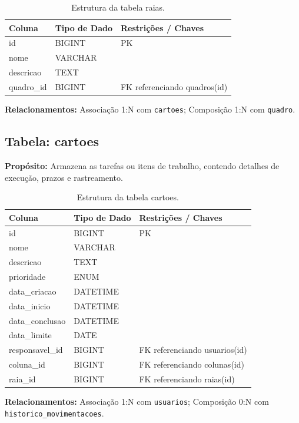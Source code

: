 \begin{table}[H]
    \centering
    \begin{tabular}{|l|l|p{8cm}|}
        \hline
        \textbf{Coluna} & \textbf{Tipo de Dado} & \textbf{Restrições / Chaves} \\
        \hline
        id & BIGINT & PK \\
        \hline
        nome & VARCHAR & \\
        \hline
        descricao & TEXT & \\
        \hline
        quadro\_id & BIGINT & FK referenciando quadros(id) \\
        \hline
    \end{tabular}
    \caption{Estrutura da tabela raias.}
\end{table}
\noindent \textbf{Relacionamentos:} Associação 1:N com \texttt{cartoes}; Composição 1:N com \texttt{quadro}.

\subsection{Tabela: cartoes}
\textbf{Propósito:} Armazena as tarefas ou itens de trabalho, contendo detalhes de execução, prazos e rastreamento.

\begin{table}[H]
    \centering
    \begin{tabular}{|l|l|p{8cm}|}
        \hline
        \textbf{Coluna} & \textbf{Tipo de Dado} & \textbf{Restrições / Chaves} \\
        \hline
        id & BIGINT & PK \\
        \hline
        nome & VARCHAR & \\
        \hline
        descricao & TEXT & \\
        \hline
        prioridade & ENUM & \\
        \hline
        data\_criacao & DATETIME & \\
        \hline
        data\_inicio & DATETIME & \\
        \hline
        data\_conclusao & DATETIME & \\
        \hline
        data\_limite & DATE & \\
        \hline
        responsavel\_id & BIGINT & FK referenciando usuarios(id) \\
        \hline
        coluna\_id & BIGINT & FK referenciando colunas(id) \\
        \hline
        raia\_id & BIGINT & FK referenciando raias(id) \\
        \hline
    \end{tabular}
    \caption{Estrutura da tabela cartoes.}
\end{table}
\noindent \textbf{Relacionamentos:} Associação 1:N com \texttt{usuarios}; Composição 0:N com \texttt{historico\_movimentacoes}.

